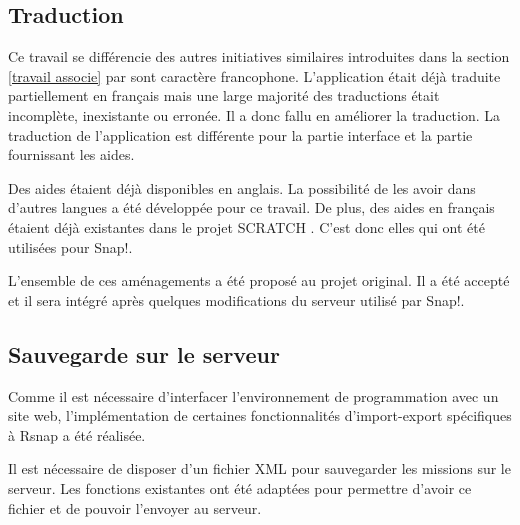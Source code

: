 \subsection{Traduction}
Ce travail se différencie des autres initiatives similaires introduites dans la section \ref{travail associe} par sont caractère francophone. L'application était déjà traduite partiellement en français mais une large majorité des traductions était incomplète, inexistante ou erronée. Il a donc fallu en améliorer la traduction. La traduction de l'application est différente pour la partie interface et la partie fournissant les aides.

Des aides étaient déjà disponibles en anglais. La possibilité de les avoir dans d'autres langues a été développée pour ce travail. De plus, des aides en français étaient déjà existantes dans le projet SCRATCH \cite{scratch-translation}. C'est donc elles qui ont été utilisées pour Snap!.

L'ensemble de ces aménagements a été proposé au projet original. Il a été accepté et il sera intégré après quelques modifications du serveur utilisé par Snap!.

\subsection{Sauvegarde sur le serveur}
Comme il est nécessaire d'interfacer l'environnement de programmation avec un site web, l'implémentation de certaines fonctionnalités d'import-export spécifiques à \gls{Rsnap} a été réalisée.

Il est nécessaire de disposer d'un fichier XML pour sauvegarder les missions sur le serveur. Les fonctions existantes ont été adaptées pour permettre d'avoir ce fichier et de pouvoir l'envoyer au serveur.
